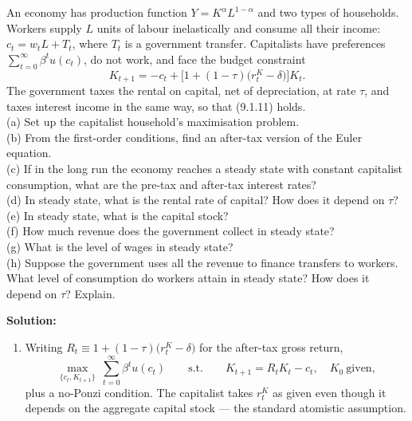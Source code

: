 \documentclass[12pt, letterpaper]{article}
\begin{document}
\begin{tcolorbox}[evenbox,title={Problem 9.6 \quad Capital Income Taxes}]
\begin{tcolorbox}[questionbox]
An economy has production function $Y=K^\alpha L^{1-\alpha}$ and two types of households.
Workers supply $L$ units of labour inelastically and consume all their income:
$c_t=w_tL+T_t$, where $T_t$ is a government transfer. Capitalists have preferences
$\sum_{t=0}^{\infty}\beta^tu(c_t)$, do not work, and face the budget constraint
\[
K_{t+1}=-c_t+\Big[1+(1-\tau)\big(r^K_t-\delta\big)\Big]K_t .
\]
The government taxes the rental on capital, net of depreciation, at rate $\tau$, and taxes
interest income in the same way, so that (9.1.11) holds.\\[3pt]
(a) Set up the capitalist household's maximisation problem.\\
(b) From the first-order conditions, find an after-tax version of the Euler equation.\\
(c) If in the long run the economy reaches a steady state with constant capitalist
consumption, what are the pre-tax and after-tax interest rates?\\
(d) In steady state, what is the rental rate of capital? How does it depend on $\tau$?\\
(e) In steady state, what is the capital stock?\\
(f) How much revenue does the government collect in steady state?\\
(g) What is the level of wages in steady state?\\
(h) Suppose the government uses all the revenue to finance transfers to workers. What level of
consumption do workers attain in steady state? How does it depend on $\tau$? Explain.
\end{tcolorbox}

\textbf{Solution:}

\begin{enumerate}
\item Writing $R_t\equiv 1+(1-\tau)\big(r^K_t-\delta\big)$ for the after-tax gross return,
\[
\max_{\{c_t,K_{t+1}\}}\ \sum_{t=0}^{\infty}\beta^t u(c_t)
\qquad\text{s.t.}\qquad
K_{t+1}=R_tK_t-c_t,\quad K_0\ \text{given},
\]
plus a no-Ponzi condition. The capitalist takes $r^K_t$ as given even though it depends on the
aggregate capital stock --- the standard atomistic assumption.


\end{enumerate}
\end{tcolorbox}
\end{document}
